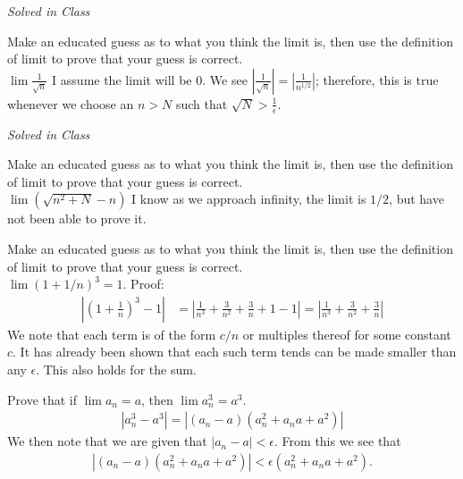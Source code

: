 \documentclass[12pt]{article}
\newenvironment{exercise}[2][Exercise]{\begin{trivlist}
\item[\hskip \labelsep {\bfseries #1}\hskip \labelsep {\bfseries #2.}]}{\end{trivlist}}
\begin{document}
\begin{exercise}{2.2.2}
\emph{Solved in Class}
\end{exercise}

\begin{exercise}{2.2.3}
Make an educated guess as to what you think the limit is, then use the definition of limit to prove that your guess is correct.\\

$\lim \frac{1}{\sqrt{n}} $ I assume the limit will be $0$. We see $| \frac{1}{\sqrt{n}}| = | \frac{1}{n^{1/2}}|$; therefore, this is true whenever we choose an $n>N$ such that $\sqrt{N}> \frac{1}{\epsilon}$.
\end{exercise}

\begin{exercise}{2.2.4}
\emph{Solved in Class}
\end{exercise}


\begin{exercise}{2.2.5}
Make an educated guess as to what you think the limit is, then use the definition of limit to prove that your guess is correct.\\

$\lim (\sqrt{n^2 + N} -n) $ I know as we approach infinity, the limit is $1/2$, but have not been able to prove it.
\end{exercise}


\begin{exercise}{2.2.6}
Make an educated guess as to what you think the limit is, then use the definition of limit to prove that your guess is correct.\\

$\lim (1 + 1/n)^3 = 1$. Proof:
	\begin{align*}
		| (1+ \frac{1}{n})^3 -1 | &= | \frac{1}{n^3} + \frac{3}{n^2}+ \frac{3}{n} + 1 - 1| = | \frac{1}{n^3} + \frac{3}{n^2}+ \frac{3}{n} |	
		\end{align*}
We note that each term is of the form $c/n$ or multiples thereof for some constant $c$. It has already been shown that each such term tends can be made smaller than any $\epsilon$. This also holds for the sum.
\end{exercise}


\begin{exercise}{2.2.8}
Prove that if $\lim a_n = a$, then $\lim a_n^3 = a^3$. 
	\begin{align*}
	|a_n^3 - a^3 | = |(a_n - a) (a_n^2 + a_n a + a^2)|
	\end{align*}
We then note that we are given that $|a_n - a| < \epsilon$. From this we see that 
	\begin{align*}
	|(a_n - a) (a_n^2 + a_n a + a^2)| < \epsilon (a_n^2 + a_n a + a^2).
	\end{align*}
\end{exercise}
\end{document}
